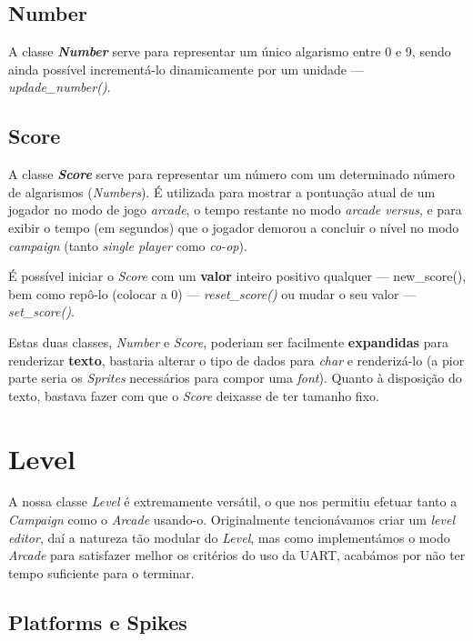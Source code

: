 \documentclass{report}
\begin{document}
\subsection{Number}

A classe \textbf{\textit{Number}} serve para representar um único algarismo entre 0 e 9, sendo ainda possível incrementá-lo dinamicamente por um unidade --- \textit{updade\_number()}.

\subsection{Score}

A classe \textbf{\textit{Score}} serve para representar um número com um determinado número de algarismos (\textit{Numbers}). É utilizada para mostrar a pontuação atual de um jogador no modo de jogo \textit{arcade}, o tempo restante no modo \textit{arcade versus}, e para exibir o tempo (em segundos) que o jogador demorou a concluir o nível no modo \textit{campaign} (tanto \textit{single player} como \textit{co-op}).

É possível iniciar o \textit{Score} com um \textbf{valor} inteiro positivo qualquer --- new\_score(), bem como repô-lo (colocar a 0) --- \textit{reset\_score()} ou mudar o seu valor --- \textit{set\_score()}. 

Estas duas classes, \textit{Number} e \textit{Score}, poderiam ser facilmente \textbf{expandidas} para renderizar \textbf{texto}, bastaria alterar o tipo de dados para \textit{char} e renderizá-lo (a pior parte seria os \textit{Sprites} necessários para compor uma \textit{font}). Quanto à disposição do texto, bastava fazer com que o \textit{Score} deixasse de ter tamanho fixo.

\section{Level}

A nossa classe \textit{Level} é extremamente versátil, o que nos permitiu efetuar tanto a \textit{Campaign} como o \textit{Arcade} usando-o. Originalmente tencionávamos criar um \textit{level editor}, daí a natureza tão modular do \textit{Level}, mas como implementámos o modo \textit{Arcade} para satisfazer melhor os critérios do uso da UART, acabámos por não ter tempo suficiente para o terminar.

\subsection{Platforms e Spikes}
\end{document}
